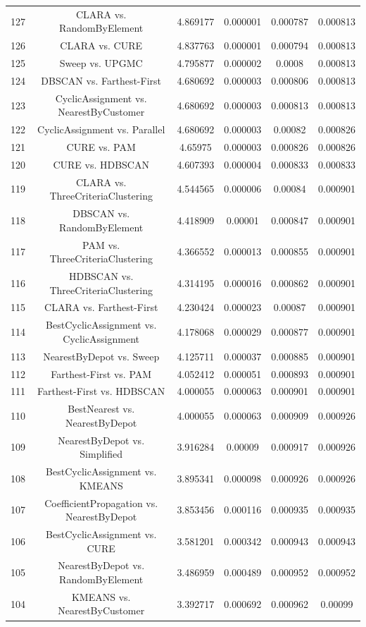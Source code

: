 \documentclass[a4paper,10pt]{article}
\begin{document}
\begin{landscape}
\begin{table}[!htp]
\begin{tabular}{cccccc}
127&CLARA vs. RandomByElement&4.869177&0.000001&0.000787&0.000813\\
126&CLARA vs. CURE&4.837763&0.000001&0.000794&0.000813\\
125&Sweep vs. UPGMC&4.795877&0.000002&0.0008&0.000813\\
124&DBSCAN vs. Farthest-First&4.680692&0.000003&0.000806&0.000813\\
123&CyclicAssignment vs. NearestByCustomer&4.680692&0.000003&0.000813&0.000813\\
122&CyclicAssignment vs. Parallel&4.680692&0.000003&0.00082&0.000826\\
121&CURE vs. PAM&4.65975&0.000003&0.000826&0.000826\\
120&CURE vs. HDBSCAN&4.607393&0.000004&0.000833&0.000833\\
119&CLARA vs. ThreeCriteriaClustering&4.544565&0.000006&0.00084&0.000901\\
118&DBSCAN vs. RandomByElement&4.418909&0.00001&0.000847&0.000901\\
117&PAM vs. ThreeCriteriaClustering&4.366552&0.000013&0.000855&0.000901\\
116&HDBSCAN vs. ThreeCriteriaClustering&4.314195&0.000016&0.000862&0.000901\\
115&CLARA vs. Farthest-First&4.230424&0.000023&0.00087&0.000901\\
114&BestCyclicAssignment vs. CyclicAssignment&4.178068&0.000029&0.000877&0.000901\\
113&NearestByDepot vs. Sweep&4.125711&0.000037&0.000885&0.000901\\
112&Farthest-First vs. PAM&4.052412&0.000051&0.000893&0.000901\\
111&Farthest-First vs. HDBSCAN&4.000055&0.000063&0.000901&0.000901\\
110&BestNearest vs. NearestByDepot&4.000055&0.000063&0.000909&0.000926\\
109&NearestByDepot vs. Simplified&3.916284&0.00009&0.000917&0.000926\\
108&BestCyclicAssignment vs. KMEANS&3.895341&0.000098&0.000926&0.000926\\
107&CoefficientPropagation vs. NearestByDepot&3.853456&0.000116&0.000935&0.000935\\
106&BestCyclicAssignment vs. CURE&3.581201&0.000342&0.000943&0.000943\\
105&NearestByDepot vs. RandomByElement&3.486959&0.000489&0.000952&0.000952\\
104&KMEANS vs. NearestByCustomer&3.392717&0.000692&0.000962&0.00099\\

\end{tabular}
\end{table}
\end{landscape}
\end{document}

